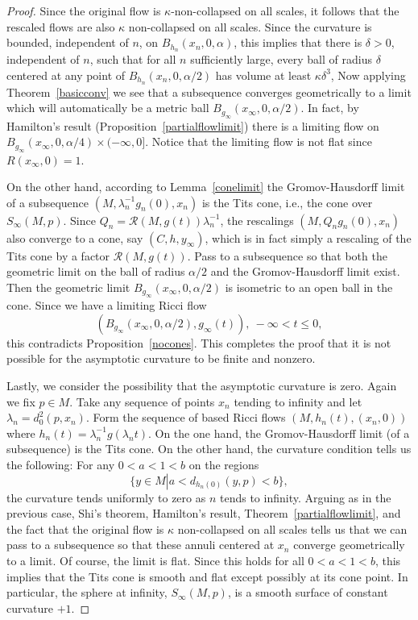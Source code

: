 \begin{proof}
Since the original flow is $\kappa$-non-collapsed on all scales, it
follows that the rescaled flows are also $\kappa$ non-collapsed on
all scales. Since the curvature is bounded, independent of $n$, on
$B_{h_n}(x_n,0,\alpha)$, this implies that there is $\delta>0$,
independent of $n$, such that for all $n$ sufficiently large, every
ball of radius $\delta$ centered at any point of
$B_{h_n}(x_n,0,\alpha/2)$ has volume at least $\kappa \delta^3$, Now
applying Theorem~\ref{basicconv} we see that  a subsequence
converges geometrically to a limit which will automatically be a
metric ball $B_{g_\infty}(x_\infty,0,\alpha/2)$. In fact, by
Hamilton's result (Proposition~\ref{partialflowlimit}) there is a
limiting flow on $B_{g_\infty}(x_\infty,0,\alpha/4)\times
(-\infty,0]$. Notice that the limiting flow is not flat since
$R(x_\infty,0)=1$.



On the other hand, according to Lemma~\ref{conelimit} the
Gromov-Hausdorff limit of a
subsequence $(M,\lambda_n^{-1}g_n(0),x_n)$ is the Tits
cone, i.e., the cone over $S_\infty(M,p)$. Since
$Q_n={\mathcal R}(M,g(t))\lambda_n^{-1}$, the rescalings
$(M,Q_ng_n(0),x_n)$  also converge to  a cone, say $(C,h,y_\infty)$,
which is in fact simply a rescaling of the Tits cone by a factor
${\mathcal R}(M,g(t))$.  Pass to a subsequence so that both the
geometric limit on the ball of radius $\alpha/2$ and the
Gromov-Hausdorff limit exist. Then the geometric limit
$B_{g_\infty}(x_\infty,0,\alpha/2)$ is isometric to an open ball in
the cone. Since we have a limiting Ricci flow
$$(B_{g_\infty}(x_\infty,0,\alpha/2),g_\infty(t)),\ -\infty<t\le 0,$$
 this contradicts Proposition~\ref{nocones}. This completes the proof that
 it is not possible for the asymptotic curvature to be finite
and nonzero.





Lastly, we consider the possibility that the asymptotic curvature is zero.
Again we fix $p\in M$. Take any sequence of points $x_n$ tending to infinity
and let $\lambda_n=d^2_0(p,x_n)$. Form the sequence of based Ricci flows
$(M,h_n(t),(x_n,0))$ where $h_n(t)=\lambda_n^{-1}g(\lambda_nt)$. On the one
hand, the Gromov-Hausdorff limit (of a subsequence) is the Tits cone. On the
other hand, the curvature condition tells us the following: For any $0<a<1<b$
on the regions
$$\{y\in M\left|\right. a< d_{h_n(0)}(y,p)<b\},$$
the curvature tends uniformly to zero as $n$ tends to infinity. Arguing as in
the previous case, Shi's theorem, Hamilton's result,
Theorem~\ref{partialflowlimit}, and the fact that the original flow is $\kappa$
non-collapsed on all scales tells us that we can pass to a subsequence so that
these annuli centered at $x_n$ converge geometrically to a limit. Of course,
the limit is flat. Since this holds for all $0<a<1<b$, this implies that the
Tits cone is smooth and flat except possibly at its cone point. In particular,
the sphere at infinity, $S_\infty(M,p)$, is a smooth surface of constant
curvature $+1$.


\end{proof}
